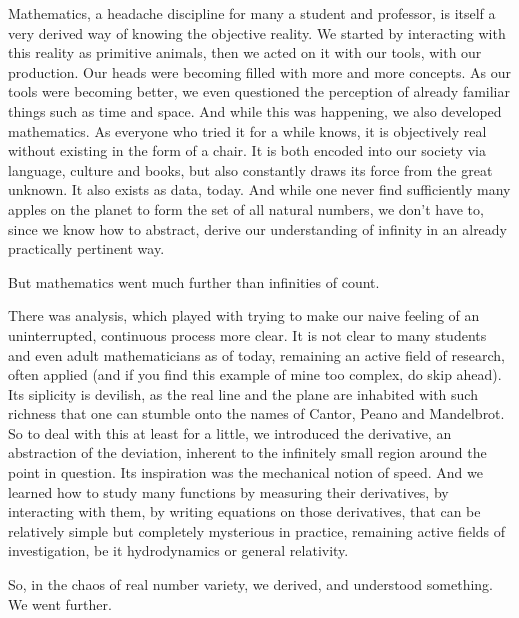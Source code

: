 \documentclass{article}
\begin{document}
Mathematics, a headache discipline for many a student and professor, is itself a very derived way of knowing the objective reality. We started by interacting with this reality as primitive animals, then we acted on it with our tools, with our production. Our heads were becoming filled with more and more concepts. As our tools were becoming better, we even questioned the perception of already familiar things such as time and space. And while this was happening, we also developed mathematics. As everyone who tried it for a while knows, it is objectively real without existing in the form of a chair. It is both encoded into our society via language, culture and books, but also constantly draws its force from the great unknown. It also exists as data, today. And while one never find sufficiently many apples on the planet to form the set of all natural numbers, we don’t have to, since we know how to abstract, derive our understanding of infinity in an already practically pertinent way.

But mathematics went much further than infinities of count.

There was analysis, which played with trying to make our naive feeling of an uninterrupted, continuous process more clear. It is not clear to many students and even adult mathematicians as of today, remaining an active field of research, often applied (and if you find this example of mine too complex, do skip ahead). Its siplicity is devilish, as the real line and the plane are inhabited with such richness that one can stumble onto the names of Cantor, Peano and Mandelbrot. So to deal with this at least for a little, we introduced the derivative, an abstraction of the deviation, inherent to the infinitely small region around the point in question. Its inspiration was the mechanical notion of speed. And we learned how to study many functions by measuring their derivatives, by interacting with them, by writing equations on those derivatives, that can be relatively simple but completely mysterious in practice, remaining active fields of investigation, be it hydrodynamics or general relativity.

So, in the chaos of real number variety, we derived, and understood something. We went further.
\end{document}
